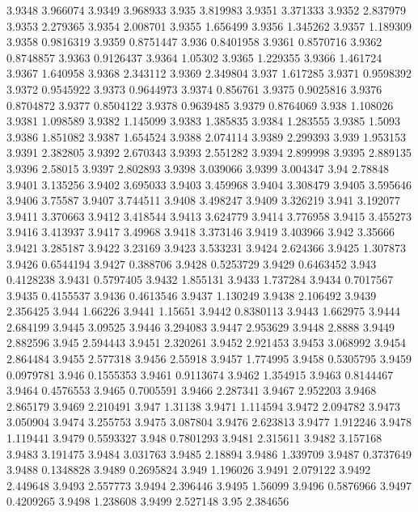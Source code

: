 3.9348  3.966074
3.9349  3.968933
3.935  3.819983
3.9351  3.371333
3.9352  2.837979
3.9353  2.279365
3.9354  2.008701
3.9355  1.656499
3.9356  1.345262
3.9357  1.189309
3.9358  0.9816319
3.9359  0.8751447
3.936  0.8401958
3.9361  0.8570716
3.9362  0.8748857
3.9363  0.9126437
3.9364  1.05302
3.9365  1.229355
3.9366  1.461724
3.9367  1.640958
3.9368  2.343112
3.9369  2.349804
3.937  1.617285
3.9371  0.9598392
3.9372  0.9545922
3.9373  0.9644973
3.9374  0.856761
3.9375  0.9025816
3.9376  0.8704872
3.9377  0.8504122
3.9378  0.9639485
3.9379  0.8764069
3.938  1.108026
3.9381  1.098589
3.9382  1.145099
3.9383  1.385835
3.9384  1.283555
3.9385  1.5093
3.9386  1.851082
3.9387  1.654524
3.9388  2.074114
3.9389  2.299393
3.939  1.953153
3.9391  2.382805
3.9392  2.670343
3.9393  2.551282
3.9394  2.899998
3.9395  2.889135
3.9396  2.58015
3.9397  2.802893
3.9398  3.039066
3.9399  3.004347
3.94  2.78848
3.9401  3.135256
3.9402  3.695033
3.9403  3.459968
3.9404  3.308479
3.9405  3.595646
3.9406  3.75587
3.9407  3.744511
3.9408  3.498247
3.9409  3.326219
3.941  3.192077
3.9411  3.370663
3.9412  3.418544
3.9413  3.624779
3.9414  3.776958
3.9415  3.455273
3.9416  3.413937
3.9417  3.49968
3.9418  3.373146
3.9419  3.403966
3.942  3.35666
3.9421  3.285187
3.9422  3.23169
3.9423  3.533231
3.9424  2.624366
3.9425  1.307873
3.9426  0.6544194
3.9427  0.388706
3.9428  0.5253729
3.9429  0.6463452
3.943  0.4128238
3.9431  0.5797405
3.9432  1.855131
3.9433  1.737284
3.9434  0.7017567
3.9435  0.4155537
3.9436  0.4613546
3.9437  1.130249
3.9438  2.106492
3.9439  2.356425
3.944  1.66226
3.9441  1.15651
3.9442  0.8380113
3.9443  1.662975
3.9444  2.684199
3.9445  3.09525
3.9446  3.294083
3.9447  2.953629
3.9448  2.8888
3.9449  2.882596
3.945  2.594443
3.9451  2.320261
3.9452  2.921453
3.9453  3.068992
3.9454  2.864484
3.9455  2.577318
3.9456  2.55918
3.9457  1.774995
3.9458  0.5305795
3.9459  0.0979781
3.946  0.1555353
3.9461  0.9113674
3.9462  1.354915
3.9463  0.8144467
3.9464  0.4576553
3.9465  0.7005591
3.9466  2.287341
3.9467  2.952203
3.9468  2.865179
3.9469  2.210491
3.947  1.31138
3.9471  1.114594
3.9472  2.094782
3.9473  3.050904
3.9474  3.255753
3.9475  3.087804
3.9476  2.623813
3.9477  1.912246
3.9478  1.119441
3.9479  0.5593327
3.948  0.7801293
3.9481  2.315611
3.9482  3.157168
3.9483  3.191475
3.9484  3.031763
3.9485  2.18894
3.9486  1.339709
3.9487  0.3737649
3.9488  0.1348828
3.9489  0.2695824
3.949  1.196026
3.9491  2.079122
3.9492  2.449648
3.9493  2.557773
3.9494  2.396446
3.9495  1.56099
3.9496  0.5876966
3.9497  0.4209265
3.9498  1.238608
3.9499  2.527148
3.95  2.384656
